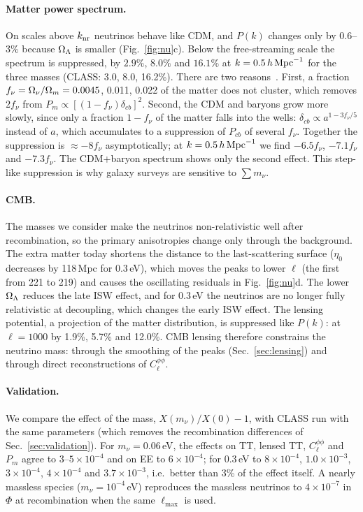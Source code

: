 \paragraph*{Matter power spectrum.} On scales above $k_{\rm nr}$ neutrinos behave like CDM, and $P(k)$ changes only
by $0.6$--3\% because $\Omega_\Lambda$ is smaller (Fig.~\ref{fig:nu}c). Below the free-streaming scale the spectrum is
suppressed, by $2.9\%$, $8.0\%$ and $16.1\%$ at $k=0.5\,h\,\mathrm{Mpc}^{-1}$ for the three masses (CLASS: 3.0, 8.0, 16.2\%).
There are two reasons~\cite{HuEisensteinTegmark1998,LesgourguesPastor2006}. First, a fraction
$f_\nu=\Omega_\nu/\Omega_m=0.0045$, 0.011, 0.022 of the matter does not cluster, which removes $2f_\nu$ from
$P_m\propto[(1-f_\nu)\delta_{cb}]^2$. Second, the CDM and baryons grow more slowly, since only a fraction $1-f_\nu$ of
the matter falls into the wells: $\delta_{cb}\propto a^{1-3f_\nu/5}$ instead of $a$, which accumulates to a
suppression of $P_{cb}$ of several $f_\nu$. Together the suppression is $\approx-8f_\nu$ asymptotically; at
$k=0.5\,h\,\mathrm{Mpc}^{-1}$ we find $-6.5f_\nu$, $-7.1f_\nu$ and $-7.3f_\nu$. The CDM+baryon spectrum shows only the second
effect. This step-like suppression is why galaxy surveys are sensitive to $\sum m_\nu$.

\paragraph*{CMB.} The masses we consider make the neutrinos non-relativistic well after recombination, so the
primary anisotropies change only through the background. The extra matter today shortens the distance to the
last-scattering surface ($\eta_0$ decreases by 118\,Mpc for 0.3\,eV), which moves the peaks to lower $\ell$ (the
first from 221 to 219) and causes the oscillating residuals in Fig.~\ref{fig:nu}d. The lower $\Omega_\Lambda$ reduces
the late ISW effect, and for 0.3\,eV the neutrinos are no longer fully relativistic at decoupling, which changes the
early ISW effect. The lensing potential, a projection of the matter distribution, is suppressed like $P(k)$: at
$\ell=1000$ by 1.9\%, 5.7\% and 12.0\%. CMB lensing therefore constrains the neutrino mass: through the smoothing of the peaks
(Sec.~\ref{sec:lensing}) and through direct reconstructions of $C_\ell^{\phi\phi}$.

\paragraph*{Validation.} We compare the effect of the mass, $X(m_\nu)/X(0)-1$, with CLASS run with the same
parameters (which removes the recombination differences of Sec.~\ref{sec:validation}). For $m_\nu=0.06$\,eV, the
effects on TT, lensed TT, $C_\ell^{\phi\phi}$ and $P_m$ agree to $3$--$5\times10^{-4}$ and on EE to $6\times10^{-4}$;
for 0.3\,eV to $8\times10^{-4}$, $1.0\times10^{-3}$, $3\times10^{-4}$, $4\times10^{-4}$ and $3.7\times10^{-3}$, i.e.\
better than 3\% of the effect itself. A nearly massless species ($m_\nu=10^{-4}$\,eV) reproduces the massless
neutrinos to $4\times10^{-7}$ in $\Phi$ at recombination when the same $\ell_{\max}$ is used.
